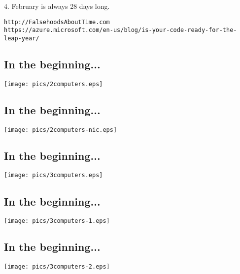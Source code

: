 \documentclass[xga]{xdvislides}
\begin{document}
4. February is always 28 days long. \\
\vspace{.5in}

\Normalsize
\verb+http://FalsehoodsAboutTime.com+ \\
\verb+https://azure.microsoft.com/en-us/blog/is-your-code-ready-for-the-leap-year/+

\subsection{In the beginning...}
\vspace*{\fill}
\begin{center}
	\texttt{[image: pics/2computers.eps]} \\
\end{center}
\vspace*{\fill}

\subsection{In the beginning...}
\vspace*{\fill}
\begin{center}
	\texttt{[image: pics/2computers-nic.eps]} \\
\end{center}
\vspace*{\fill}

\subsection{In the beginning...}
\vspace*{\fill}
\begin{center}
	\texttt{[image: pics/3computers.eps]} \\
\end{center}
\vspace*{\fill}

\subsection{In the beginning...}
\vspace*{\fill}
\begin{center}
	\texttt{[image: pics/3computers-1.eps]} \\
\end{center}
\vspace*{\fill}

\subsection{In the beginning...}
\vspace*{\fill}
\begin{center}
	\texttt{[image: pics/3computers-2.eps]} \\
\end{center}
\vspace*{\fill}
\end{document}
